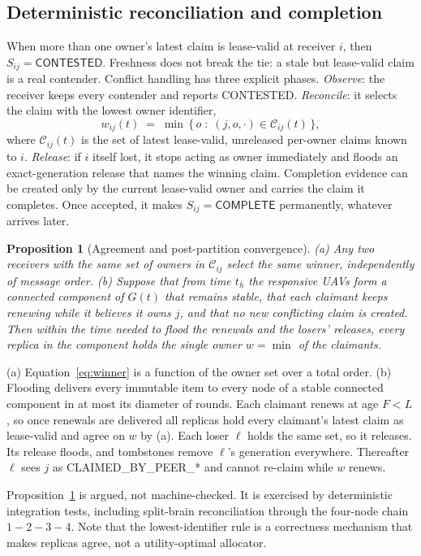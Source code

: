 \documentclass[conference]{IEEEtran}
\newcommand{\stt}[1]{\textsf{#1}}     %
\newtheorem{proposition}{Proposition}
\begin{document}
\subsection{Deterministic reconciliation and completion}
\label{sec:reconcile}

When more than one owner's latest claim is lease-valid at receiver $i$, then
$S_{ij}=\stt{CONTESTED}$. Freshness does not break the tie: a stale but
lease-valid claim is a real contender. Conflict handling has three explicit
phases. \emph{Observe}: the receiver keeps every contender and reports
\stt{CONTESTED}. \emph{Reconcile}: it selects the claim with the lowest owner
identifier,
\begin{equation}
  w_{ij}(t) \;=\; \min\,\{\, o \;:\; (j,o,\cdot)\in \mathcal{C}_{ij}(t) \,\},
  \label{eq:winner}
\end{equation}
where $\mathcal{C}_{ij}(t)$ is the set of latest lease-valid, unreleased
per-owner claims known to $i$. \emph{Release}: if $i$ itself lost, it stops
acting as owner immediately and floods an exact-generation release that
names the winning claim. Completion evidence can be created only by the
current lease-valid owner and carries the claim it completes. Once accepted,
it makes $S_{ij}=\stt{COMPLETE}$ permanently, whatever arrives later.

\begin{proposition}[Agreement and post-partition convergence]
\label{prop:converge}
(a) Any two receivers with the same set of owners in $\mathcal{C}_{ij}$ select
the same winner, independently of message order. (b) Suppose that from time
$t_h$ the responsive UAVs form a connected component of $G(t)$ that remains
stable, that each claimant keeps renewing while it believes it owns $j$, and
that no new conflicting claim is created. Then within the time needed to flood
the renewals and the losers' releases, every replica in the component holds
the single owner $w=\min$ of the claimants.
\end{proposition}
\begin{IEEEproof}
(a) Equation~\eqref{eq:winner} is a function of the owner set over a total
order. (b) Flooding delivers every immutable item to every node of a stable
connected component in at most its diameter of rounds. Each claimant renews
at age $F<L$, so once renewals are delivered all replicas hold every
claimant's latest claim as lease-valid and agree on $w$ by (a). Each loser
$\ell$ holds the same set, so it releases. Its release floods, and tombstones
remove $\ell$'s generation everywhere. Thereafter $\ell$ sees $j$ as
\stt{CLAIMED\_BY\_PEER\_*} and cannot re-claim while $w$ renews.
\end{IEEEproof}
Proposition~\ref{prop:converge} is argued, not machine-checked. It is
exercised by deterministic integration tests, including split-brain
reconciliation through the four-node chain $1\!-\!2\!-\!3\!-\!4$. Note that
the lowest-identifier rule is a correctness mechanism that makes replicas
agree, not a utility-optimal allocator.
\end{document}
